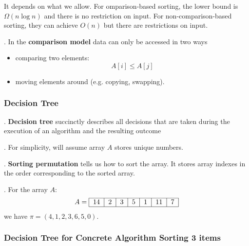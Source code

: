 \documentclass{article}
\begin{document}
\begin{solution}
    It depends on what we allow. For omparison-based sorting, the lower bound is $\Omega (n \log{n})$ and there is no restriction on input. For non-comparison-based sorting, they can achieve $O(n)$ but there are restrictions on input. 
\end{solution}

\begin{deff}.
    In the \textbf{comparison model} data can only be accessed in two ways 
    \begin{itemize}
        \item comparing two elements: 
        \[ A[i] \leq A[j] \] 
        \item moving elements around (e.g. copying, swapping). 
    \end{itemize} 
\end{deff}

\subsubsection{Decision Tree}

\begin{deff}.
    \textbf{Decision tree} succinctly describes all decisions that are taken during the execution of an algorithm and the resulting outcome
\end{deff}

\begin{comm}[].
    For simplicity, will assume array $A$ stores unique numbers. 
\end{comm}

\begin{deff}.
    \textbf{Sorting permutation} tells us how to sort the array. It stores array indexes in the order corresponding to the sorted array. 
\end{deff}

\begin{examplee}[].
    For the array $A$: 
    \[ A = \begin{tabular}{|c|c|c|c|c|c|c|}
        \hline 14 & 2 & 3 & 5 & 1 & 11 & 7 \\ \hline
    \end{tabular} \]
    we have $\pi = (4,1,2,3,6,5,0)$. 
\end{examplee}

\subsubsection{Decision Tree for Concrete Algorithm Sorting 3 items} 
\end{document}
